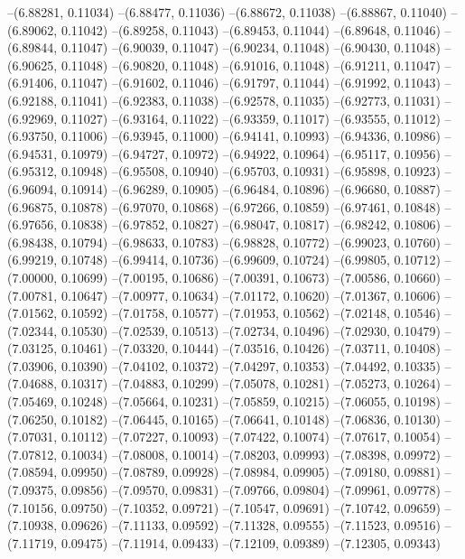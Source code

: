 --(6.88281, 0.11034)
--(6.88477, 0.11036)
--(6.88672, 0.11038)
--(6.88867, 0.11040)
--(6.89062, 0.11042)
--(6.89258, 0.11043)
--(6.89453, 0.11044)
--(6.89648, 0.11046)
--(6.89844, 0.11047)
--(6.90039, 0.11047)
--(6.90234, 0.11048)
--(6.90430, 0.11048)
--(6.90625, 0.11048)
--(6.90820, 0.11048)
--(6.91016, 0.11048)
--(6.91211, 0.11047)
--(6.91406, 0.11047)
--(6.91602, 0.11046)
--(6.91797, 0.11044)
--(6.91992, 0.11043)
--(6.92188, 0.11041)
--(6.92383, 0.11038)
--(6.92578, 0.11035)
--(6.92773, 0.11031)
--(6.92969, 0.11027)
--(6.93164, 0.11022)
--(6.93359, 0.11017)
--(6.93555, 0.11012)
--(6.93750, 0.11006)
--(6.93945, 0.11000)
--(6.94141, 0.10993)
--(6.94336, 0.10986)
--(6.94531, 0.10979)
--(6.94727, 0.10972)
--(6.94922, 0.10964)
--(6.95117, 0.10956)
--(6.95312, 0.10948)
--(6.95508, 0.10940)
--(6.95703, 0.10931)
--(6.95898, 0.10923)
--(6.96094, 0.10914)
--(6.96289, 0.10905)
--(6.96484, 0.10896)
--(6.96680, 0.10887)
--(6.96875, 0.10878)
--(6.97070, 0.10868)
--(6.97266, 0.10859)
--(6.97461, 0.10848)
--(6.97656, 0.10838)
--(6.97852, 0.10827)
--(6.98047, 0.10817)
--(6.98242, 0.10806)
--(6.98438, 0.10794)
--(6.98633, 0.10783)
--(6.98828, 0.10772)
--(6.99023, 0.10760)
--(6.99219, 0.10748)
--(6.99414, 0.10736)
--(6.99609, 0.10724)
--(6.99805, 0.10712)
--(7.00000, 0.10699)
--(7.00195, 0.10686)
--(7.00391, 0.10673)
--(7.00586, 0.10660)
--(7.00781, 0.10647)
--(7.00977, 0.10634)
--(7.01172, 0.10620)
--(7.01367, 0.10606)
--(7.01562, 0.10592)
--(7.01758, 0.10577)
--(7.01953, 0.10562)
--(7.02148, 0.10546)
--(7.02344, 0.10530)
--(7.02539, 0.10513)
--(7.02734, 0.10496)
--(7.02930, 0.10479)
--(7.03125, 0.10461)
--(7.03320, 0.10444)
--(7.03516, 0.10426)
--(7.03711, 0.10408)
--(7.03906, 0.10390)
--(7.04102, 0.10372)
--(7.04297, 0.10353)
--(7.04492, 0.10335)
--(7.04688, 0.10317)
--(7.04883, 0.10299)
--(7.05078, 0.10281)
--(7.05273, 0.10264)
--(7.05469, 0.10248)
--(7.05664, 0.10231)
--(7.05859, 0.10215)
--(7.06055, 0.10198)
--(7.06250, 0.10182)
--(7.06445, 0.10165)
--(7.06641, 0.10148)
--(7.06836, 0.10130)
--(7.07031, 0.10112)
--(7.07227, 0.10093)
--(7.07422, 0.10074)
--(7.07617, 0.10054)
--(7.07812, 0.10034)
--(7.08008, 0.10014)
--(7.08203, 0.09993)
--(7.08398, 0.09972)
--(7.08594, 0.09950)
--(7.08789, 0.09928)
--(7.08984, 0.09905)
--(7.09180, 0.09881)
--(7.09375, 0.09856)
--(7.09570, 0.09831)
--(7.09766, 0.09804)
--(7.09961, 0.09778)
--(7.10156, 0.09750)
--(7.10352, 0.09721)
--(7.10547, 0.09691)
--(7.10742, 0.09659)
--(7.10938, 0.09626)
--(7.11133, 0.09592)
--(7.11328, 0.09555)
--(7.11523, 0.09516)
--(7.11719, 0.09475)
--(7.11914, 0.09433)
--(7.12109, 0.09389)
--(7.12305, 0.09343)
